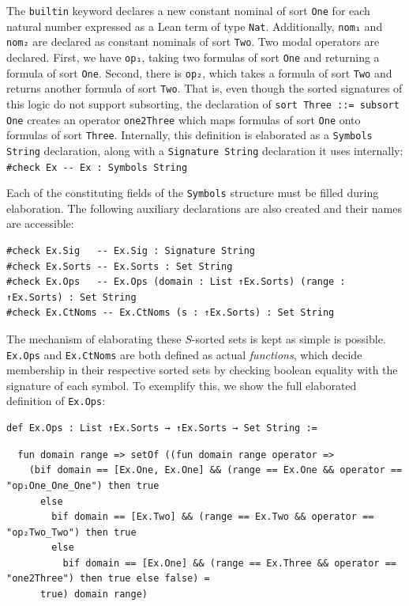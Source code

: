 \documentclass{easychair}
\theoremstyle{remark}
\begin{document}
The \lstinline|builtin| keyword declares a new constant nominal of sort \lstinline|One| for each natural number expressed as a Lean term of type \lstinline|Nat|. Additionally, \lstinline|nom₁| and \lstinline|nom₂| are declared as constant nominals of sort \lstinline|Two|. Two modal operators are declared. First, we have \lstinline|op₁|, taking two formulas of sort \lstinline|One| and returning a formula of sort \lstinline|One|. Second, there is \lstinline|op₂|, which takes a formula of sort \lstinline|Two| and returns another formula of sort \lstinline|Two|. %
That is, even though the sorted signatures of this logic do not support subsorting, the declaration of \lstinline|sort Three ::= subsort One| creates an operator \lstinline|one2Three| which maps formulas of sort \lstinline|One| onto formulas of sort \lstinline|Three|. Internally, this definition is elaborated as a \lstinline|Symbols String| declaration, along with a \lstinline|Signature String| declaration it uses internally: \lstinline{#check Ex -- Ex : Symbols String}

Each of the constituting fields of the \lstinline{Symbols} structure must  be filled during elaboration. The following auxiliary declarations are also created and their names are accessible:
\begin{lstlisting}
#check Ex.Sig   -- Ex.Sig : Signature String
#check Ex.Sorts -- Ex.Sorts : Set String
#check Ex.Ops   -- Ex.Ops (domain : List ↑Ex.Sorts) (range : ↑Ex.Sorts) : Set String
#check Ex.CtNoms -- Ex.CtNoms (s : ↑Ex.Sorts) : Set String
\end{lstlisting}

The mechanism of elaborating these $S$-sorted sets is kept as simple is possible. \lstinline{Ex.Ops} and \lstinline{Ex.CtNoms} are both defined as actual \textit{functions}, which decide membership in their respective sorted sets by checking boolean equality with the signature of each symbol. To exemplify this, we show the full elaborated definition of \lstinline{Ex.Ops}:

\begin{lstlisting}
def Ex.Ops : List ↑Ex.Sorts → ↑Ex.Sorts → Set String :=
\end{lstlisting}
\vspace{-1em}
\begin{lstlisting}
  fun domain range => setOf ((fun domain range operator =>
    (bif domain == [Ex.One, Ex.One] && (range == Ex.One && operator == "op₁One_One_One") then true
      else
        bif domain == [Ex.Two] && (range == Ex.Two && operator == "op₂Two_Two") then true
        else
          bif domain == [Ex.One] && (range == Ex.Three && operator == "one2Three") then true else false) =
      true) domain range)
\end{lstlisting}
\end{document}
